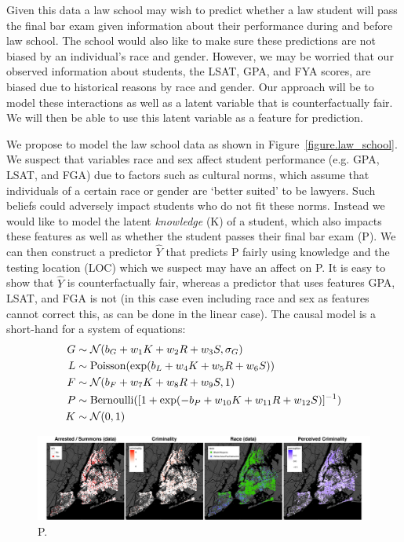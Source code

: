 Given this data a law school may wish to predict whether a law student will pass the final bar exam given information about their performance during and before law school. The school would also like to make sure these predictions are not biased by an individual's race and gender. However, we may be worried that our observed information about students, the LSAT, GPA, and FYA scores, are biased due to historical reasons by race and gender. Our approach will be to model these interactions as well as a latent variable that is counterfactually fair. We will then be able to use this latent variable as a feature for prediction.

We propose to model the law school data as shown in Figure~\ref{figure.law_school}. We suspect that variables race and sex affect student performance (e.g. GPA, LSAT, and FGA) due to factors such as cultural norms, which assume that individuals of a certain race or gender are `better suited' to be lawyers. Such beliefs could adversely impact students who do not fit these norms. Instead we would like to model the latent \emph{knowledge} (K) of a student, which also impacts these features as well as whether the student passes their final bar exam (P). We can then construct a predictor $\hat{Y}$ that predicts P fairly using knowledge and the testing location (LOC) which we suspect may have an affect on P. It is easy to show that $\hat{Y}$ is counterfactually fair, whereas a predictor that uses features GPA, LSAT, and FGA is not (in this case even including race and sex as features cannot correct this, as can be done in the linear case). The causal model is a short-hand for a system of equations:
\begin{align}
G &\sim {\cal N}(b_G + w_1 K + w_2 R + w_3 S, \sigma_G) \nonumber \\
L &\sim \textrm{Poisson}(\exp(b_L + w_4 K + w_5 R + w_6 S)) \nonumber \\
F &\sim {\cal N}(b_F + w_7 K + w_8 R + w_{9} S, 1) \nonumber \\
P &\sim \textrm{Bernoulli}([1+\exp(-b_P + w_{10} K + w_{11} R + w_{12} S)]^{-1}) \nonumber \\
K &\sim {\cal N}(0,1) \nonumber
\end{align}

 

\begin{figure}[th]
\begin{center}
\vspace{-2ex}
\centerline{\includegraphics[width=\textwidth]{stop_and_frisk_graphs.png}}
\vspace{-2ex}
\caption{P.}
\label{figure.criminality}
\vspace{-2ex}
\end{center}
\end{figure}

